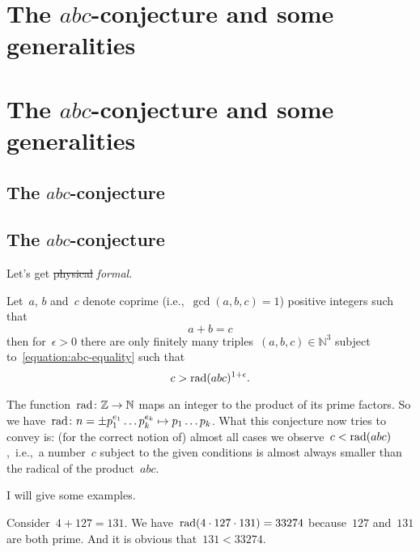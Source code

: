 \iftex
\section[The abc-conjecture and some generalities]{The $abc$-conjecture and some generalities}
\label{section:abc}
\fi
\ifblog
\section{The $abc$-conjecture and some generalities}
\label{section:abc}
\fi

\iftex
\subsection[The abc-conjecture]{The $abc$-conjecture}
\fi
\ifblog
\subsection{The $abc$-conjecture}
\fi

Let's get \sout{physical} \emph{formal}.

\begin{conjecture}
  \label{conjecture:abc}
  Let~$a$, $b$ and~$c$ denote coprime (i.e.,~$\gcd(a,b,c)=1$) positive integers such that
  \begin{equation}
    \label{equation:abc-equality}
    a+b=c
  \end{equation}
  then for~$\epsilon>0$ there are only finitely many triples~$(a,b,c)\in\mathbb{N}^3$ subject to~\eqref{equation:abc-equality} such that
  \begin{equation}
    \label{equation:abc-inequality}
    c>\operatorname{rad}(abc)^{1+\epsilon}.
  \end{equation}
\end{conjecture}

The function~$\operatorname{rad}\colon\mathbb{Z}\to\mathbb{N}$ maps an integer to the product of its prime factors. So we have~$\operatorname{rad}\colon n=\pm p_1^{e_1}\ldots p_k^{e_k}\mapsto p_1\ldots p_k$. What this conjecture now tries to convey is: (for the correct notion of) almost all cases we observe~$c<\operatorname{rad}(abc)$,~i.e.,~a number~$c$ subject to the given conditions is almost always smaller than the radical of the product~$abc$.

I will give some examples.

\begin{example}
  \label{example:abc-1}
  Consider~$4+127=131$. We have~$\operatorname{rad}(4\cdot 127\cdot 131)=33274$ because~$127$ and~$131$ are both prime. And it is obvious that~$131<33274$.
\end{example}

